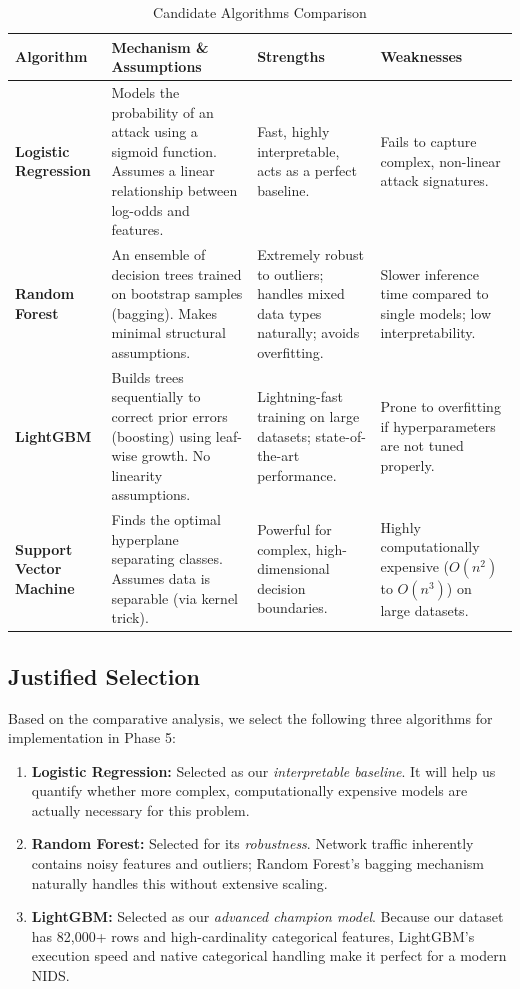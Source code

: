 \documentclass[12pt, a4paper]{article}
\begin{document}
\begin{table}[h]
\centering
\begin{tabular}{|p{}|p{}|p{}|p{}|}
\hline
\textbf{Algorithm} & \textbf{Mechanism \& Assumptions} & \textbf{Strengths} & \textbf{Weaknesses} \\
\hline
\textbf{Logistic Regression} & Models the probability of an attack using a sigmoid function. Assumes a linear relationship between log-odds and features. & Fast, highly interpretable, acts as a perfect baseline. & Fails to capture complex, non-linear attack signatures. \\
\hline
\textbf{Random Forest} & An ensemble of decision trees trained on bootstrap samples (bagging). Makes minimal structural assumptions. & Extremely robust to outliers; handles mixed data types naturally; avoids overfitting. & Slower inference time compared to single models; low interpretability. \\
\hline
\textbf{LightGBM} & Builds trees sequentially to correct prior errors (boosting) using leaf-wise growth. No linearity assumptions. & Lightning-fast training on large datasets; state-of-the-art performance. & Prone to overfitting if hyperparameters are not tuned properly. \\
\hline
\textbf{Support Vector Machine} & Finds the optimal hyperplane separating classes. Assumes data is separable (via kernel trick). & Powerful for complex, high-dimensional decision boundaries. & Highly computationally expensive ($O(n^2)$ to $O(n^3)$) on large datasets. \\
\hline
\end{tabular}
\caption{Candidate Algorithms Comparison}
\label{tab:algorithm_comparison}
\end{table}

\subsection{Justified Selection}
Based on the comparative analysis, we select the following three algorithms for implementation in Phase 5:
\begin{enumerate}
    \item \textbf{Logistic Regression:} Selected as our \textit{interpretable baseline}. It will help us quantify whether more complex, computationally expensive models are actually necessary for this problem.
    \item \textbf{Random Forest:} Selected for its \textit{robustness}. Network traffic inherently contains noisy features and outliers; Random Forest's bagging mechanism naturally handles this without extensive scaling.
    \item \textbf{LightGBM:} Selected as our \textit{advanced champion model}. Because our dataset has 82,000+ rows and high-cardinality categorical features, LightGBM's execution speed and native categorical handling make it perfect for a modern NIDS.
\end{enumerate}
\end{document}

